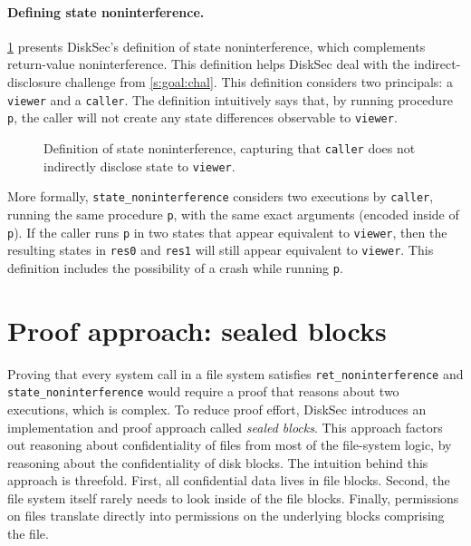 \paragraph{Defining state noninterference.}

\ref{fig:two-safety-state} presents DiskSec's definition
of state noninterference, which complements return-value
noninterference.  This definition helps DiskSec deal with the indirect-disclosure
challenge from \ref{s:goal:chal}.  This definition
considers two principals: a \texttt{viewer} and a \texttt{caller}.  The definition
intuitively says that, by running procedure \texttt{p}, the caller will not
create any state differences observable to \texttt{viewer}.

\begin{figure}[ht]
  
  \caption{Definition of state noninterference, capturing that \texttt{caller}
    does not indirectly disclose state to \texttt{viewer}.}
  \label{fig:two-safety-state}
\end{figure}

More formally, \texttt{state\_noninterference} considers two executions
by \texttt{caller}, running the same procedure \texttt{p}, with the same exact
arguments (encoded inside of \texttt{p}).  If the caller runs \texttt{p} in two
states that appear equivalent to \texttt{viewer}, then the resulting states
in \texttt{res0} and \texttt{res1} will still appear equivalent to \texttt{viewer}.
This definition includes the possibility of a crash while running \texttt{p}.

\section{Proof approach: sealed blocks}
\label{s:proof}

Proving that every system call in a file system satisfies
\texttt{ret\_noninterference} and \texttt{state\_noninterference} would require
a proof that reasons about two executions, which is complex.  To reduce
proof effort, DiskSec introduces an implementation and proof approach
called \emph{sealed blocks}.  This approach factors out reasoning
about confidentiality of files from most of the file-system logic,
by reasoning about the confidentiality of disk blocks.  The intuition
behind this approach is threefold.  First, all confidential data lives
in file blocks.  Second, the file system itself rarely needs to look
inside of the file blocks.  Finally, permissions on files translate
directly into permissions on the underlying blocks comprising the file.

